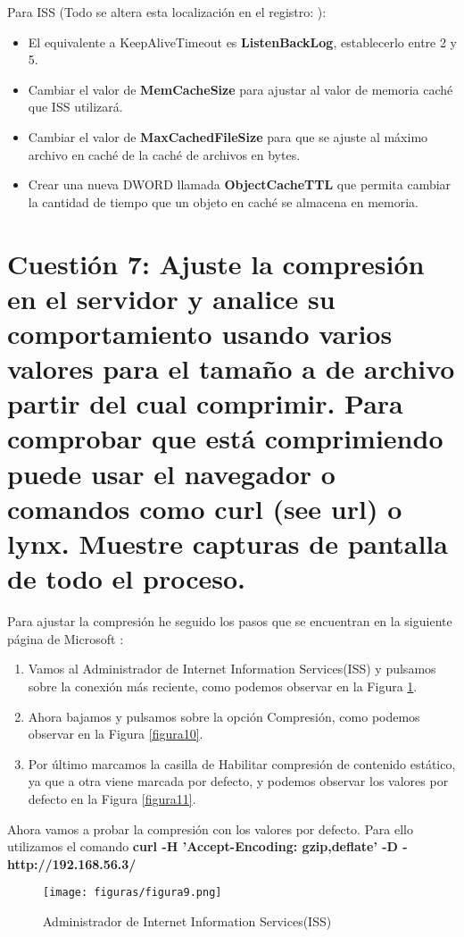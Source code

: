 Para ISS (Todo se altera esta localización en el registro: \textbf{}):
\begin{itemize}
	\item El equivalente a KeepAliveTimeout es \textbf{ListenBackLog}, establecerlo entre 2 y 5.
	\item Cambiar el valor de \textbf{MemCacheSize} para ajustar al valor de memoria caché que ISS utilizará.
	\item Cambiar el valor de \textbf{MaxCachedFileSize} para que se ajuste al máximo archivo en caché de la caché de archivos en bytes.
	\item Crear una nueva DWORD llamada \textbf{ ObjectCacheTTL} que permita cambiar la cantidad de tiempo que un objeto en caché se almacena en memoria.
\end{itemize}

\section{Cuestión 7: Ajuste la compresión en el servidor y analice su comportamiento usando varios valores para el tamaño a de archivo partir del cual comprimir. Para comprobar que está comprimiendo puede usar el navegador o comandos como curl (see url) o lynx. Muestre capturas de pantalla de todo el proceso.}

Para ajustar la compresión he seguido los pasos que se encuentran en la siguiente página de Microsoft \cite{compression}:

\begin{enumerate}
	\item Vamos al Administrador de Internet Information Services(ISS) y pulsamos sobre la conexión más reciente, como podemos observar en la Figura \ref{figura9}.
	\item Ahora bajamos y pulsamos sobre la opción Compresión, como podemos observar en la Figura \ref{figura10}.
	\item Por último marcamos la casilla de Habilitar compresión de contenido estático, ya que a otra viene marcada por defecto, y podemos observar los valores por defecto en la Figura \ref{figura11}.
\end{enumerate}

Ahora vamos a probar la compresión con los valores por defecto. Para ello utilizamos el comando \textbf{curl -H 'Accept-Encoding: gzip,deflate' -D -  http://192.168.56.3/}
\begin{figure}[H] %
	\centering
	\texttt{[image: figuras/figura9.png]}  %
	
	
	\caption{Administrador de Internet Information Services(ISS)}
	\label{figura9}
\end{figure}

